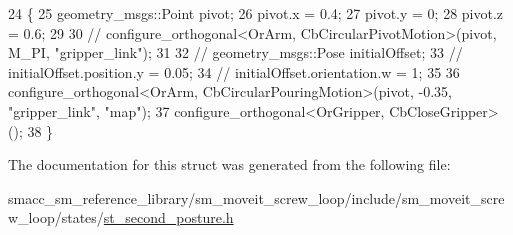 \begin{DoxyCode}
24         \{
25             geometry\_msgs::Point pivot;
26             pivot.x = 0.4;
27             pivot.y = 0;
28             pivot.z = 0.6;
29 
30             \textcolor{comment}{// configure\_orthogonal<OrArm, CbCircularPivotMotion>(pivot, M\_PI, "gripper\_link");}
31 
32             \textcolor{comment}{// geometry\_msgs::Pose initialOffset;}
33             \textcolor{comment}{// initialOffset.position.y = 0.05;}
34             \textcolor{comment}{// initialOffset.orientation.w = 1;}
35 
36             configure\_orthogonal<OrArm, CbCircularPouringMotion>(pivot, -0.35, \textcolor{stringliteral}{"gripper\_link"}, \textcolor{stringliteral}{"map"});
37             configure\_orthogonal<OrGripper, CbCloseGripper>();
38         \}
\end{DoxyCode}


The documentation for this struct was generated from the following file\+:\begin{DoxyCompactItemize}
\item 
smacc\+\_\+sm\+\_\+reference\+\_\+library/sm\+\_\+moveit\+\_\+screw\+\_\+loop/include/sm\+\_\+moveit\+\_\+screw\+\_\+loop/states/\hyperlink{st__second__posture_8h}{st\+\_\+second\+\_\+posture.\+h}\end{DoxyCompactItemize}
